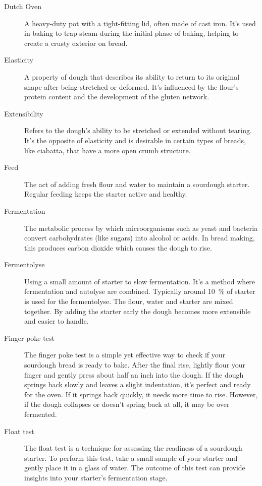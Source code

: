 \begin{description}
\item[Dutch Oven] A heavy-duty pot with a tight-fitting lid, often made of cast
iron. It's used in baking to trap steam during the initial phase of baking, helping
to create a crusty exterior on bread.

\item[Elasticity] A property of dough that describes its ability to return to
its original shape after being stretched or deformed. It's influenced by the flour's
protein content and the development of the gluten network.

\item[Extensibility] Refers to the dough’s ability to be stretched or extended
without tearing. It's the opposite of elasticity and is desirable in certain types
of breads, like ciabatta, that have a more open crumb structure.

\item[Feed] The act of adding fresh flour and water to maintain a sourdough
starter. Regular feeding keeps the starter active and healthy.

\item[Fermentation] The metabolic process by which microorganisms such as yeast
and bacteria convert carbohydrates (like sugars) into alcohol or acids. In bread
making, this produces carbon dioxide which causes the dough to rise.

\item[Fermentolyse] Using a small amount of starter to slow fermentation.
It's a method where fermentation and autolyse are combined. Typically around \SI{10}{\percent}
of starter is used for the fermentolyse. The flour, water and starter are mixed
together. By adding the starter early the dough becomes more extensible and easier
to handle.

\item[Finger poke test] The finger poke test is a simple yet effective way to
check if your sourdough bread is ready to bake. After the final rise, lightly
flour your finger and gently press about half an inch into the dough.
If the dough springs back slowly and leaves a slight indentation, it's perfect
and ready for the oven. If it springs back quickly, it needs more time to rise.
However, if the dough collapses or doesn't spring back at all, it may be
over fermented.

\item[Float test] The float test is a technique for assessing the readiness
of a sourdough starter. To perform this test, take a small sample of
your starter and gently place it in a glass of water. The outcome
of this test can provide insights into your starter's fermentation stage.


\end{description}
